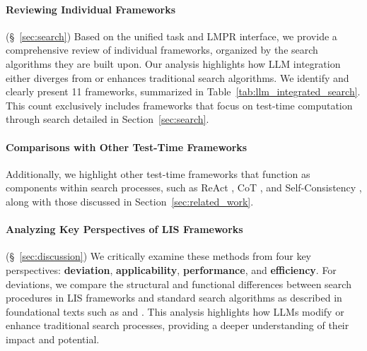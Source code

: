\paragraph{Reviewing Individual Frameworks} (\S~\ref{sec:search})
Based on the unified task and LMPR interface, we provide a comprehensive review of individual frameworks, organized by the search algorithms they are built upon. Our analysis highlights how LLM integration either diverges from or enhances traditional search algorithms. 
We identify and clearly present 11 frameworks, summarized in Table~\ref{tab:llm_integrated_search}. This count exclusively includes frameworks that focus on test-time computation through search detailed in Section~\ref{sec:search}. 

\paragraph{Comparisons with Other Test-Time Frameworks}
Additionally, we highlight other test-time frameworks that function as components within search processes, such as ReAct \citep{yao2023react}, CoT \citep{wei2022chain}, and Self-Consistency \citep{wang2023selfconsistency}, along with those discussed in Section~\ref{sec:related_work}.

    
\paragraph{Analyzing Key Perspectives of LIS Frameworks} 
(\S~\ref{sec:discussion})
We critically examine these methods from four key perspectives: \textbf{deviation}, \textbf{applicability}, \textbf{performance}, and \textbf{efficiency}. For deviations, we compare the structural and functional differences between search procedures in LIS frameworks and standard search algorithms as described in foundational texts such as \citet{russell2010artificial} and \citet{sutton2018reinforcement}. 
This analysis highlights how LLMs modify or enhance traditional search processes, providing a deeper understanding of their impact and potential.

